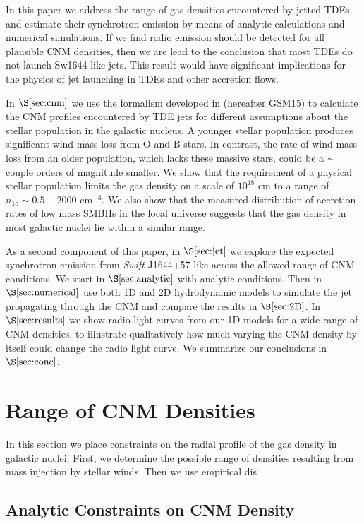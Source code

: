 \documentclass[usenatbib,fleqn]{mnras}
\begin{document}
In this paper we address the range of gas densities encountered by
jetted TDEs and estimate their synchrotron emission by means of
analytic calculations and numerical simulations.  If we find radio
emission should be detected for all plausible CNM densities, then we
are lead to the conclusion that most TDEs do not launch Sw1644-like
jets.  This result would have significant implications for the physics
of jet launching in TDEs and other accretion flows. 

In $\S\ref{sec:cnm}$ we use the formalism developed in
\citet{Generozov+2015} (hereafter GSM15) to calculate the CNM profiles
encountered by TDE jets for different assumptions about the stellar
population in the galactic nucleus.  A younger stellar population
produces significant wind mass loss from O and B stars. In contrast,
the rate of wind mass loss from an older population, which lacks these
massive stars, could be a $\sim$couple orders of magnitude smaller.
We show that the requirement of a physical stellar population limits
the gas density on a scale of $10^{18}$ cm to a range of $n_{18} \sim
0.5-2000$ cm$^{-3}$. We also show that the measured distribution of
accretion rates of low mass SMBHs in the local universe suggests that
the gas density in most galactic nuclei lie within a similar range.

As a second component of this paper, in $\S\ref{sec:jet}$ we explore
the expected synchrotron emission from {\it Swift} J1644+57-like
across the allowed range of CNM conditions.  We start in
$\S\ref{sec:analytic}$ with analytic conditions.  Then in
$\S\ref{sec:numerical}$ use both 1D and 2D hydrodynamic models to
simulate the jet propagating through the CNM and compare the results
in $\S\ref{sec:2D}$. In $\S\ref{sec:results}$ we show radio light
curves from our 1D models for a wide range of CNM densities, to
illustrate qualitatively how much varying the CNM density by itself
could change the radio light curve.  We summarize our conclusions in
$\S\ref{sec:conc}$.

\section{Range of CNM Densities}
\label{sec:cnm}

In this section we place constraints on the radial profile of the gas
density in galactic nuclei. First, we determine the possible range of
densities resulting from mass injection by stellar winds. Then we use
empirical dis

\subsection{Analytic Constraints on CNM Density}
\end{document}
